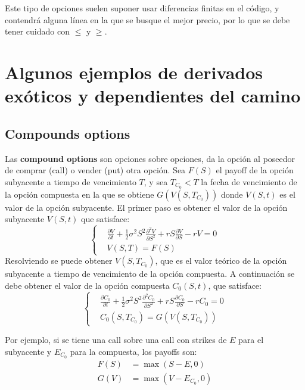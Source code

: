 Este tipo de opciones suelen suponer usar diferencias finitas en el código, y contendrá alguna línea en la que se busque el mejor precio, por lo que se debe tener cuidado con $\leq$ y $\geq$.







\section{Algunos ejemplos de derivados exóticos y dependientes del camino}

\subsection{Compounds options}
Las \textbf{compound options} son opciones sobre opciones, da la opción al poseedor de comprar (call) o vender (put) otra opción. Sea $F(S)$ el payoff de la opción subyacente a tiempo de vencimiento $T$, y sea $T_{C_0} < T$ la fecha de vencimiento de la opción compuesta en la que se obtiene $G(V(S,T_{C_0}))$ donde $V(S,t)$ es el valor de la opción subyacente. El primer paso es obtener el valor de la opción subyacente $V(S,t)$ que satisface:
\[
    \boxed{
        \left\{
        \begin{aligned}
            &\frac{\partial V}{\partial t} + \frac{1}{2}\sigma^2 S^2 \frac{\partial^2 V}{\partial S^2} + r S \frac{\partial V}{\partial S} - r V = 0 \\
            &V(S,T) = F(S)
        \end{aligned}
        \right.
    }
\]
Resolviendo se puede obtener $V(S,T_{C_0})$, que es el valor teórico de la opción subyacente a tiempo de vencimiento de la opción compuesta. A continuación se debe obtener el valor de la opción compuesta $C_0(S,t)$, que satisface:
\[
    \boxed{
        \left\{
        \begin{aligned}
            &\frac{\partial C_0}{\partial t} + \frac{1}{2}\sigma^2 S^2 \frac{\partial^2 C_0}{\partial S^2} + r S \frac{\partial C_0}{\partial S} - r C_0 = 0 \\
            &C_0(S,T_{C_0}) = G(V(S,T_{C_0}))
        \end{aligned}
        \right.
    }
\]

Por ejemplo, si se tiene una call sobre una call con strikes de $E$ para el subyacente y $E_{C_0}$ para la compuesta, los payoffs son:
\begin{align*}
    F(S) &= \max(S - E, 0) \\
    G(V) &= \max(V - E_{C_0}, 0)
\end{align*}




